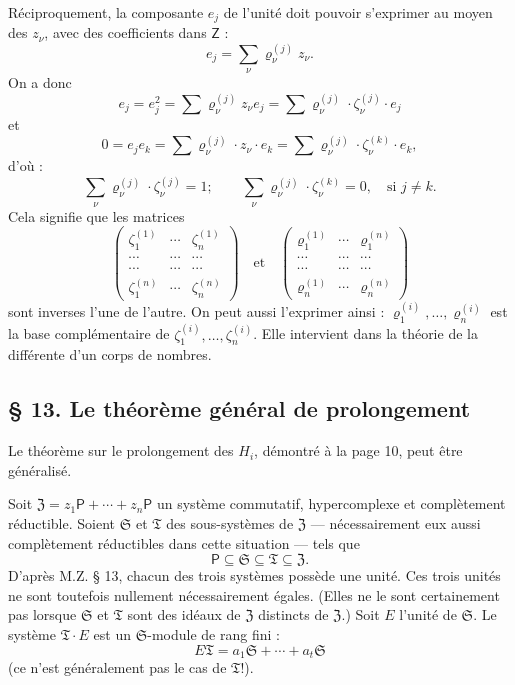 Réciproquement, la composante \(e_j\) de l'unité doit pouvoir s'exprimer au moyen des \(z_\nu\), avec des coefficients dans \(\mathsf Z\) :
\[
e_j=\sum_\nu \varrho_\nu^{(j)}z_\nu .
\]
On a donc
\[
e_j=e_j^2=\sum \varrho_\nu^{(j)}z_\nu e_j
=\sum \varrho_\nu^{(j)}\cdot\zeta_\nu^{(j)}\cdot e_j
\]
et
\[
0=e_je_k=\sum \varrho_\nu^{(j)}\cdot z_\nu\cdot e_k
=\sum \varrho_\nu^{(j)}\cdot\zeta_\nu^{(k)}\cdot e_k,
\]
d'où :
\[
\sum_\nu \varrho_\nu^{(j)}\cdot\zeta_\nu^{(j)}=1;
\qquad
\sum_\nu \varrho_\nu^{(j)}\cdot\zeta_\nu^{(k)}=0,\quad
\text{si } j\ne k.
\]
Cela signifie que les matrices
\[
\begin{pmatrix}
\zeta_1^{(1)} & \cdots & \zeta_n^{(1)}\\
\cdots & \cdots & \cdots\\
\cdots & \cdots & \cdots\\
\zeta_1^{(n)} & \cdots & \zeta_n^{(n)}
\end{pmatrix}
\quad\text{et}\quad
\begin{pmatrix}
\varrho_1^{(1)} & \cdots & \varrho_1^{(n)}\\
\cdots & \cdots & \cdots\\
\cdots & \cdots & \cdots\\
\varrho_n^{(1)} & \cdots & \varrho_n^{(n)}
\end{pmatrix}
\]
sont inverses l'une de l'autre. On peut aussi l'exprimer ainsi : \(\varrho_1^{(i)},\ldots,\varrho_n^{(i)}\) est la base complémentaire de \(\zeta_1^{(i)},\ldots,\zeta_n^{(i)}\). Elle intervient dans la théorie de la différente d'un corps de nombres.

\subsection*{\S{} 13. Le théorème général de prolongement}\label{der-allgemeine-fortsetzungssatz}

Le théorème sur le prolongement des \(H_i\), démontré à la page 10, peut être généralisé.

Soit \(\mathfrak Z=z_1\mathsf P+\cdots+z_n\mathsf P\) un système commutatif, hypercomplexe et complètement réductible. Soient \(\mathfrak S\) et \(\mathfrak T\) des sous-systèmes de \(\mathfrak Z\) --- nécessairement eux aussi complètement réductibles dans cette situation --- tels que
\[
\mathsf P\subseteq\mathfrak S\subseteq\mathfrak T\subseteq\mathfrak Z .
\]
D'après M.Z. \S{} 13, chacun des trois systèmes possède une unité. Ces trois unités ne sont toutefois nullement nécessairement égales. (Elles ne le sont certainement pas lorsque \(\mathfrak S\) et \(\mathfrak T\) sont des idéaux de \(\mathfrak Z\) distincts de \(\mathfrak Z\).) Soit \(E\) l'unité de \(\mathfrak S\). Le système \(\mathfrak T\cdot E\) est un \(\mathfrak S\)-module de rang fini :
\[
E\mathfrak T=a_1\mathfrak S+\cdots+a_t\mathfrak S
\]
(ce n'est généralement pas le cas de \(\mathfrak T\)!).

